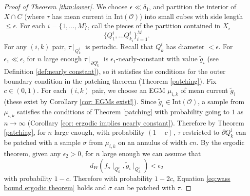\documentclass[11pt]{article}
\theoremstyle{remark}
\theoremstyle{definition}
\newcommand{\mc}[1]{\mathcal{#1}}
\begin{document}
\begin{proof}[Proof of Theorem \ref{thm:lower}]
We choose $\epsilon \ll \delta_1$, and partition the interior of $X\cap C$ (where $\tau$ has mean current in $\text{Int}(\mc O)$) into small cubes with side length $\leq \epsilon$. For each $i=\{1,...,M\}$, call the pieces of the partition contained in $X_i$
$$\{Q_1^{i},...Q_{k_i}^i\}_{i=1}^M.$$
For any $(i,k)$ pair, $\tau\mid_{Q_k^i}$ is periodic. Recall that $Q_k^i$ has diameter $<\epsilon$. For $\epsilon_1\ll \epsilon$, for $n$ large enough $\tau\mid_{\partial Q_k^i}$ is $\epsilon_1$-nearly-constant with value $\widetilde g_i$ (see Definition \ref{def:nearly constant}), so it satisfies the conditions for the outer boundary condition in the patching theorem (Theorem \ref{patching}). Fix $c\in (0,1)$. For each $(i,k)$ pair, we choose an EGM $\mu_{i,k}$ of mean current $\widetilde g_i$ (these exist by Corollary \ref{cor: EGMs exist!}). Since $\widetilde g_i\in \text{Int}(\mc O)$, a sample from $\mu_{i,k}$ satisfies the conditions of Theorem \ref{patching} with probability going to $1$ as $n\to \infty$ (Corollary \ref{cor: ergodic implies nearly constant}). Therefore by Theorem \ref{patching}, for $n$ large enough, with probability $(1-c)$, $\tau$ restricted to $\partial Q_k^i$ can be patched with a sample $\sigma$ from $\mu_{i,k}$ on an annulus of width $cn$. By the ergodic theorem, given any $\epsilon_2>0$, for $n$ large enough we can assume that \begin{equation}\label{eq:wass bound ergodic theorem}
d_W(f_\sigma\mid_{Q_k^i},\widetilde g_i\mid_{Q_k^i})<\epsilon_2
\end{equation}
with probability $1-c$. Therefore with probability $1-2c$, Equation \eqref{eq:wass bound ergodic theorem} holds and $\sigma$ can be patched with $\tau$.


\end{proof}
\end{document}
